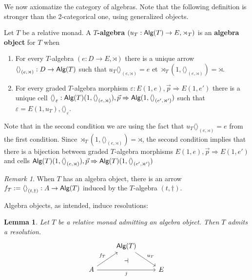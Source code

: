 \documentclass[10pt,a4paper]{article}
\newcommand{\cat}[1]{\textcat{#1}}
\newcommand{\textcat}[1]{{\normalfont\textsf{#1}}}
\newcommand{\To}{\Rightarrow}
\newcommand{\tp}[1]{\langle#1\rangle}
\newcommand{\unit}{{\tp{}}}
\DeclareMathOperator{\Alg}{\cat{Alg}}
\theoremstyle{plain}
\newtheorem{lemma}[theorem]{Lemma}
\theoremstyle{definition}
\theoremstyle{remark}
\newtheorem{remark}[theorem]{Remark}
\begin{document}
We now axiomatize the category of algebras. Note that the following definition is stronger than the 2-categorical one, using generalized objects.

\begin{definition}
    \label{def:alg_obj}
    Let $T$ be a relative monad. A \textbf{$T$-algebra} $(u_T : \Alg(T) \to E, \rtimes_T)$ is an \textbf{algebra object} for $T$ when
    \begin{enumerate}
        \item For every $T$-algebra $(e : D \to E, \rtimes)$ there is a unique arrow $\unit_{(e, \rtimes)} : D \to \Alg(T)$ such that $u_T\unit_{(e, \rtimes)} = e$ et $\rtimes_T(1, \unit_{(e, \rtimes)}) = \rtimes$.
        \item For every graded $T$-algebra morphism $\varepsilon : E(1, e), \vec p \To E(1, e')$ there is a unique cell $\unit_\varepsilon : \Alg(T)(1, \unit_{(e, \rtimes)}), \vec p \To \Alg(1, \unit_{(e', \rtimes')})$ such that $\varepsilon = E(1, u_T), \unit_\varepsilon$.
    \end{enumerate}
\end{definition}

Note that in the second condition we are using the fact that $u_T\unit_{(e, \rtimes)} = e$ from the first condition. Since $\rtimes_T(1, \unit_{(e, \rtimes)}) = \rtimes$, the second condition implies that there is a bijection between graded $T$-algebra morphisms $E(1, e), \vec p \To E(1, e')$ and cells $\Alg(T)(1, \unit_{(e, \rtimes)}), \vec p \To \Alg(T)(1, \unit_{(e', \rtimes')})$

\begin{remark}
    When $T$ has an algebra object, there is an arrow $f_T := \unit_{(t, \dag)} : A \to \Alg(T)$ induced by the $T$-algebra $(t, \dag)$.
\end{remark}

Algebra objects, as intended, induce resolutions:

\begin{lemma}
    \label{lem:rmnd_alg_obj_res}
    Let $T$ be a relative monad admitting an algebra object. Then $T$ admits a resolution.
    \[\begin{tikzcd}
        & \Alg(T) \ar[dr, "u_T"] &\\
        A \ar[ur, "f_T"] \ar[rr, "j"'] &{}& E
        \ar[from=1-2, to=2-2, phantom, "\dashv"{anchor=center}]
    \end{tikzcd}\]
\end{lemma}
\end{document}
